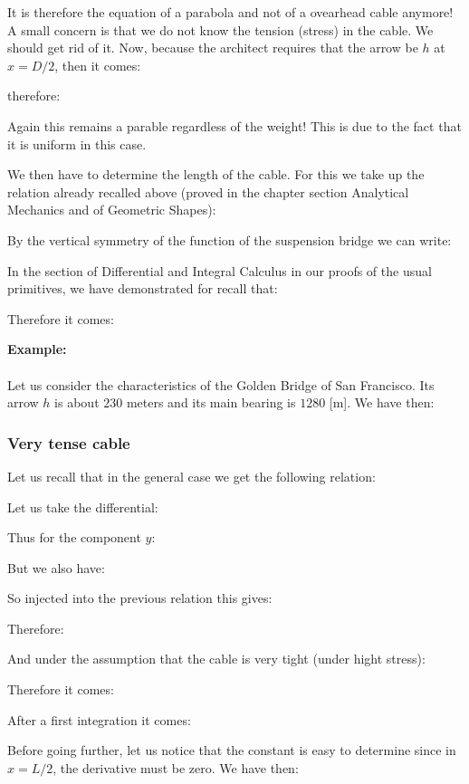 	It is therefore the equation of a parabola and not of a ovearhead cable anymore! A small concern is that we do not know the tension (stress) in the cable. We should get rid of it. Now, because the architect requires that the arrow be $h$ at $x = D / 2$, then it comes:
	
	therefore:
	
	Again this remains a parable regardless of the weight! This is due to the fact that it is uniform in this case.

	We then have to determine the length of the cable. For this we take up the relation already recalled above (proved in the chapter section Analytical Mechanics and of Geometric Shapes):
	
	By the vertical symmetry of the function of the suspension bridge we can write:
	
	In the section of Differential and Integral Calculus in our proofs of the usual primitives, we have demonstrated for recall that:
	
	Therefore it comes:
	
	\begin{tcolorbox}[colframe=black,colback=white,sharp corners]
	\textbf{{\Large {}}Example:}\\\\
	Let us consider the characteristics of the Golden Bridge of San Francisco. Its arrow $h$ is about $230$ meters and its main bearing is $1280$ [m]. We have then:
	
	\end{tcolorbox}
	
	\pagebreak
	\subsubsection{Very tense cable}
	Let us recall that in the general case we get the following relation:
	
	Let us take the differential:
	
	Thus for the component $y$:
	
	But we also have:
	
	So injected into the previous relation this gives:
	
	Therefore:
	
	And under the assumption that the cable is very tight (under hight stress):
	
	Therefore it comes:
	
	After a first integration it comes:
	
	Before going further, let us notice that the constant is easy to determine since in $x = L / 2$, the derivative must be zero. We have then:
	
